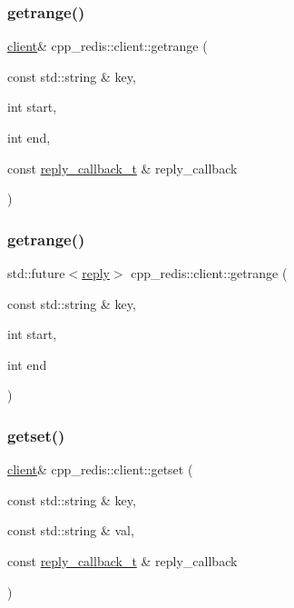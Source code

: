 \subsubsection{\texorpdfstring{getrange()}{getrange()}\hspace{0.1cm}{\footnotesize\ttfamily [1/2]}}
{\footnotesize\ttfamily \hyperlink{classcpp__redis_1_1client}{client}\& cpp\+\_\+redis\+::client\+::getrange (\begin{DoxyParamCaption}\item[{const std\+::string \&}]{key,  }\item[{int}]{start,  }\item[{int}]{end,  }\item[{const \hyperlink{classcpp__redis_1_1client_a061a1140d36d2eaeda82b09a0bb3f9f2}{reply\+\_\+callback\+\_\+t} \&}]{reply\+\_\+callback }\end{DoxyParamCaption})}

\mbox{\label{classcpp__redis_1_1client_a3a0ed59f7fc32ba22c1a9be3c02e5468}} 
\subsubsection{\texorpdfstring{getrange()}{getrange()}\hspace{0.1cm}{\footnotesize\ttfamily [2/2]}}
{\footnotesize\ttfamily std\+::future$<$\hyperlink{classcpp__redis_1_1reply}{reply}$>$ cpp\+\_\+redis\+::client\+::getrange (\begin{DoxyParamCaption}\item[{const std\+::string \&}]{key,  }\item[{int}]{start,  }\item[{int}]{end }\end{DoxyParamCaption})}

\mbox{\label{classcpp__redis_1_1client_a124dca021c3aedd3f8cbb52263e7fec8}} 
\subsubsection{\texorpdfstring{getset()}{getset()}\hspace{0.1cm}{\footnotesize\ttfamily [1/2]}}
{\footnotesize\ttfamily \hyperlink{classcpp__redis_1_1client}{client}\& cpp\+\_\+redis\+::client\+::getset (\begin{DoxyParamCaption}\item[{const std\+::string \&}]{key,  }\item[{const std\+::string \&}]{val,  }\item[{const \hyperlink{classcpp__redis_1_1client_a061a1140d36d2eaeda82b09a0bb3f9f2}{reply\+\_\+callback\+\_\+t} \&}]{reply\+\_\+callback }\end{DoxyParamCaption})}

